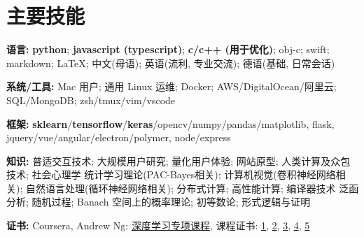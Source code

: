 \section{\textbf{主要技能}}
\resumeSubHeadingListStart
\item{
  \textbf{语言:}{ \textbf{python}; \textbf{javascript (typescript)}; \textbf{c/c++ (用于优化)}; obj-c; swift; markdown; \LaTeX; 中文(母语); 英语(流利, 专业交流); 德语(基础, 日常会话)}
}
\item{
 \textbf{系统/工具:}{ Mac 用户; 通用 Linux 运维; Docker; AWS/DigitalOcean/阿里云; SQL/MongoDB; zsh/tmux/vim/vscode}
}
\item{
 \textbf{框架:}{ \textbf{sklearn}/\textbf{tensorflow}/\textbf{keras}/opencv/numpy/pandas/matplotlib, flask, jquery/vue/angular/electron/polymer, node/express}
}
\item{
  \textbf{知识:}{ 
    \resumeItemListStart
       { 普适交互技术; 大规模用户研究; 量化用户体验; 网站原型; 人类计算及众包技术; 社会心理学}
       { 统计学习理论(PAC-Bayes相关); 计算机视觉(卷积神经网络相关); 自然语言处理(循环神经网络相关); 分布式计算; 高性能计算; 编译器技术}
       { 泛函分析; 随机过程; Banach 空间上的概率理论; 初等数论; 形式逻辑与证明}
   \resumeItemListEnd
  }
}
\item{
 \textbf{证书:}{
  Coursera, Andrew Ng: \href{https://www.coursera.org/account/accomplishments/specialization/QGH8ZVJ6J2L2}{深度学习专项课程}, 课程证书:
  \href{https://www.coursera.org/account/accomplishments/verify/YH4NT7HHN263}{1}, 
  \href{https://www.coursera.org/account/accomplishments/verify/QGH3GNGF6BM4}{2}, 
  \href{https://www.coursera.org/account/accomplishments/verify/6VU45R2SZEF6}{3},
  \href{https://www.coursera.org/account/accomplishments/verify/LF3K9BQQDLVL}{4},
  \href{https://www.coursera.org/account/accomplishments/verify/JQFLW2DPYAGW}{5}
 }
}
\resumeSubHeadingListEnd